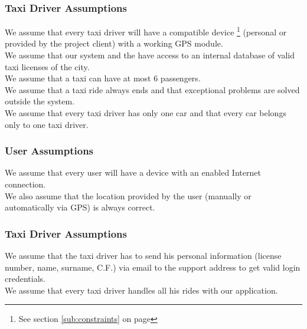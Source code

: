 \subsubsection{Taxi Driver Assumptions} 
We assume that every taxi driver will have a compatible device  \footnote{See section \ref{sub:constraints} on page \pageref{sub:constraints}} (personal or provided by the project client) with a working GPS module.\\
We assume that our system and the \emph{} have access to an internal database of valid taxi licenses of the city.\\
We assume that a taxi can have at most 6 passengers.\\
We assume that a taxi ride always ends and that exceptional problems are solved outside the system.\\
We assume that every taxi driver has only one car and that every car belongs only to one taxi driver.
\subsubsection{User Assumptions} 
\label{ssub:user_assumptions}
We assume that every user will have a device with an enabled Internet connection.\\
We also assume that the location provided by the user (manually or automatically via GPS) is always correct.
\subsubsection{Taxi Driver Assumptions} 
\label{ssub:driver_assumptions}
We assume that the taxi driver has to send his personal information (license number, name, surname, C.F.) via email to the support address to get valid login credentials.\\ 
We assume that every taxi driver handles all his rides with our application.

